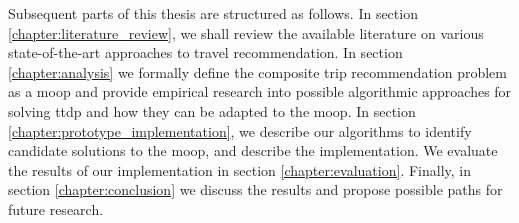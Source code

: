Subsequent parts of this thesis are structured as follows. In section \ref{chapter:literature_review}, we shall review the available literature on various state-of-the-art approaches to travel recommendation. In section \ref{chapter:analysis} we formally define the composite trip recommendation problem as a \gls{moop} and provide empirical research into possible algorithmic approaches for solving \gls{ttdp} and how they can be adapted to the \gls{moop}. In section \ref{chapter:prototype_implementation}, we describe our algorithms to identify candidate solutions to the \gls{moop}, and describe the implementation. We evaluate the results of our implementation in section \ref{chapter:evaluation}. Finally, in section \ref{chapter:conclusion} we discuss the results and propose possible paths for future research. 




